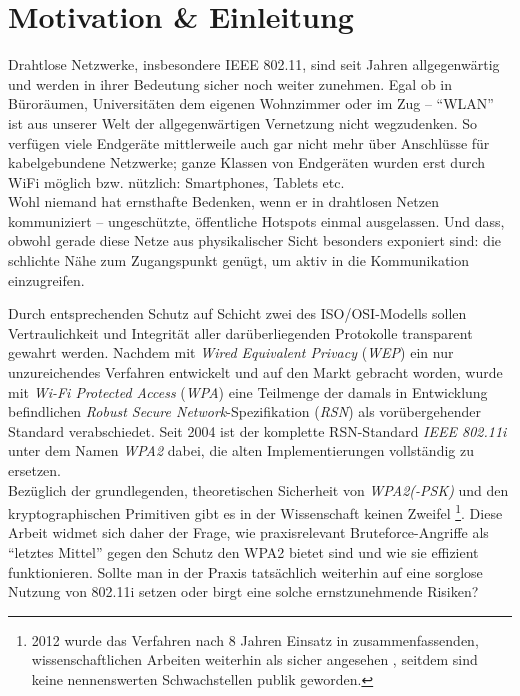 \section{Motivation \& Einleitung}
Drahtlose Netzwerke, insbesondere IEEE 802.11, sind seit Jahren allgegenwärtig und werden in ihrer Bedeutung sicher noch weiter zunehmen. Egal ob in Büroräumen, Universitäten dem eigenen Wohnzimmer oder im Zug -- \enquote{WLAN} ist aus unserer Welt der allgegenwärtigen Vernetzung nicht wegzudenken. 
So verfügen viele Endgeräte mittlerweile auch gar nicht mehr über Anschlüsse für kabelgebundene Netzwerke; ganze Klassen von Endgeräten wurden erst durch WiFi möglich bzw. nützlich: Smartphones, Tablets etc.\\

Wohl niemand hat ernsthafte Bedenken, wenn er in drahtlosen Netzen kommuniziert -- ungeschützte, öffentliche Hotspots einmal ausgelassen. 
Und dass, obwohl gerade diese Netze aus physikalischer Sicht besonders exponiert sind: die schlichte Nähe zum Zugangspunkt genügt, um aktiv in die Kommunikation einzugreifen.

Durch entsprechenden Schutz auf Schicht zwei des ISO/OSI-Modells sollen Vertraulichkeit und Integrität aller darüberliegenden Protokolle transparent gewahrt werden.
Nachdem mit \textit{Wired Equivalent Privacy} (\textit{WEP}) ein nur unzureichendes Verfahren entwickelt und auf den Markt gebracht worden, wurde mit \textit{Wi-Fi Protected Access} (\textit{WPA}) eine Teilmenge der damals in Entwicklung befindlichen \textit{Robust Secure Network}-Spezifikation (\textit{RSN}) als vorübergehender Standard verabschiedet. %
Seit 2004 ist der komplette RSN-Standard \textit{IEEE 802.11i} unter dem Namen \textit{WPA2} dabei, die alten Implementierungen vollständig zu ersetzen.\\

Bezüglich der grundlegenden, theoretischen Sicherheit von \textit{WPA2(-PSK)} und den kryptographischen Primitiven gibt es in der Wissenschaft keinen Zweifel \footnote{2012 wurde das Verfahren nach 8 Jahren Einsatz in zusammenfassenden, wissenschaftlichen Arbeiten weiterhin als sicher angesehen \cite{kumkar2012}, seitdem sind keine nennenswerten Schwachstellen publik geworden.}. %
Diese Arbeit widmet sich daher der Frage, wie praxisrelevant Bruteforce-Angriffe als \enquote{letztes Mittel} gegen den Schutz den WPA2 bietet sind und wie sie effizient funktionieren.
Sollte man in der Praxis tatsächlich weiterhin auf eine sorglose Nutzung von 802.11i setzen oder birgt eine solche ernstzunehmende Risiken?\\

